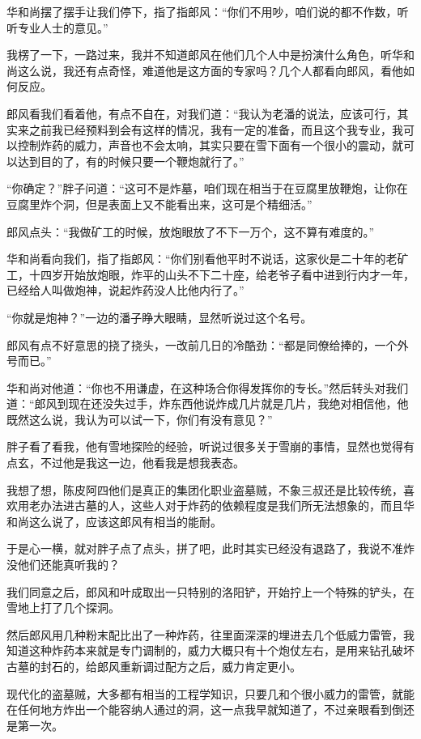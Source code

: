 华和尚摆了摆手让我们停下，指了指郎风：“你们不用吵，咱们说的都不作数，听听专业人士的意见。”

我楞了一下，一路过来，我并不知道郎风在他们几个人中是扮演什么角色，听华和尚这么说，我还有点奇怪，难道他是这方面的专家吗？几个人都看向郎风，看他如何反应。

郎风看我们看着他，有点不自在，对我们道：“我认为老潘的说法，应该可行，其实来之前我已经预料到会有这样的情况，我有一定的准备，而且这个我专业，我可以控制炸药的威力，声音也不会太响，其实只要在雪下面有一个很小的震动，就可以达到目的了，有的时候只要一个鞭炮就行了。”

“你确定？”胖子问道：“这可不是炸墓，咱们现在相当于在豆腐里放鞭炮，让你在豆腐里炸个洞，但是表面上又不能看出来，这可是个精细活。”

郎风点头：“我做矿工的时候，放炮眼放了不下一万个，这不算有难度的。”

华和尚看向我们，指了指郎风：“你们别看他平时不说话，这家伙是二十年的老矿工，十四岁开始放炮眼，炸平的山头不下二十座，给老爷子看中进到行内才一年，已经给人叫做炮神，说起炸药没人比他内行了。”

“你就是炮神？”一边的潘子睁大眼睛，显然听说过这个名号。

郎风有点不好意思的挠了挠头，一改前几日的冷酷劲：“都是同僚给捧的，一个外号而已。”

华和尚对他道：“你也不用谦虚，在这种场合你得发挥你的专长。”然后转头对我们道：“郎风到现在还没失过手，炸东西他说炸成几片就是几片，我绝对相信他，他既然这么说，我认为可以试一下，你们有没有意见？”

胖子看了看我，他有雪地探险的经验，听说过很多关于雪崩的事情，显然也觉得有点玄，不过他是我这一边，他看我是想我表态。

我想了想，陈皮阿四他们是真正的集团化职业盗墓贼，不象三叔还是比较传统，喜欢用老办法进古墓的人，这些人对于炸药的依赖程度是我们所无法想象的，而且华和尚这么说了，应该这郎风有相当的能耐。

于是心一横，就对胖子点了点头，拼了吧，此时其实已经没有退路了，我说不准炸没他们还能真听我的？

我们同意之后，郎风和叶成取出一只特别的洛阳铲，开始拧上一个特殊的铲头，在雪地上打了几个探洞。

然后郎风用几种粉末配比出了一种炸药，往里面深深的埋进去几个低威力雷管，我知道这种炸药本来就是专门调制的，威力大概只有十个炮仗左右，是用来钻孔破坏古墓的封石的，给郎风重新调过配方之后，威力肯定更小。

现代化的盗墓贼，大多都有相当的工程学知识，只要几和个很小威力的雷管，就能在任何地方炸出一个能容纳人通过的洞，这一点我早就知道了，不过亲眼看到倒还是第一次。

